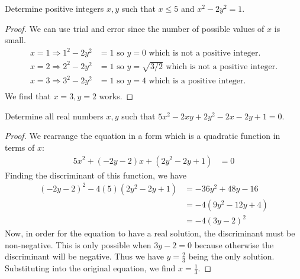 \documentclass[12pt]{article}
\begin{document}
    \begin{myprob}{}{}
        Determine positive integers $x, y$ such that $x\leq 5$ and $x^2-2y^2=1$.
        
        \begin{proof}
            We can use trial and error since the number of possible values of $x$ is small.
            \begin{align*}
                x=1\Longrightarrow 1^2-2y^2&=1\text{ so $y=0$ which is not a positive integer.}\\
                x=2\Longrightarrow 2^2-2y^2&=1\text{ so $y=\sqrt{3/2}$ which is not a positive integer.}\\
                x=3\Longrightarrow 3^2-2y^2&=1\text{ so $y=4$ which is a positive integer.}\\
            \end{align*}
            We find that $x=3, y=2$ works.
        \end{proof}
    \end{myprob}

    \begin{myprob}{}{}
        Determine all real numbers $x, y$ such that $5x^2-2xy+2y^2-2x-2y+1=0$.
        
        \begin{proof}
            We rearrange the equation in a form which is a quadratic function in terms of $x$:
            \begin{align*}
                5x^2+(-2y-2)x+(2y^2-2y+1)&=0
            \end{align*}
            Finding the discriminant of this function, we have
            \begin{align*}
                (-2y-2)^2-4(5)(2y^2-2y+1)&=-36y^2+48y-16\\
                &=-4(9y^2-12y+4)\\
                &=-4(3y-2)^2
            \end{align*}
            Now, in order for the equation to have a real solution, the discriminant must be non-negative. This is only possible when $3y-2=0$ because otherwise the discriminant will be negative. Thus we have $y=\frac{2}{3}$ being the only solution. Substituting into the original equation, we find $x=\frac{1}{3}$.
        \end{proof}
    \end{myprob}
\end{document}
